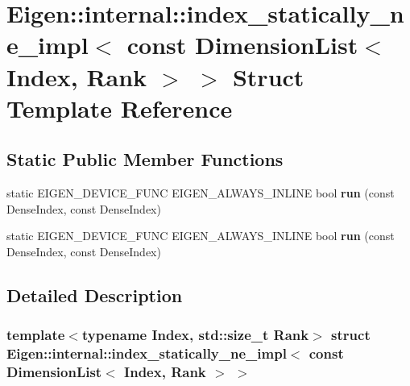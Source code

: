 \hypertarget{struct_eigen_1_1internal_1_1index__statically__ne__impl_3_01const_01_dimension_list_3_01_index_00_01_rank_01_4_01_4}{}\section{Eigen\+:\+:internal\+:\+:index\+\_\+statically\+\_\+ne\+\_\+impl$<$ const Dimension\+List$<$ Index, Rank $>$ $>$ Struct Template Reference}
\label{struct_eigen_1_1internal_1_1index__statically__ne__impl_3_01const_01_dimension_list_3_01_index_00_01_rank_01_4_01_4}
\subsection*{Static Public Member Functions}
\begin{DoxyCompactItemize}
\item 
\mbox{\label{struct_eigen_1_1internal_1_1index__statically__ne__impl_3_01const_01_dimension_list_3_01_index_00_01_rank_01_4_01_4_a2ba33884de59582908b842d65fdfe77e}} 
static E\+I\+G\+E\+N\+\_\+\+D\+E\+V\+I\+C\+E\+\_\+\+F\+U\+NC E\+I\+G\+E\+N\+\_\+\+A\+L\+W\+A\+Y\+S\+\_\+\+I\+N\+L\+I\+NE bool {\bfseries run} (const Dense\+Index, const Dense\+Index)
\item 
\mbox{\label{struct_eigen_1_1internal_1_1index__statically__ne__impl_3_01const_01_dimension_list_3_01_index_00_01_rank_01_4_01_4_a2ba33884de59582908b842d65fdfe77e}} 
static E\+I\+G\+E\+N\+\_\+\+D\+E\+V\+I\+C\+E\+\_\+\+F\+U\+NC E\+I\+G\+E\+N\+\_\+\+A\+L\+W\+A\+Y\+S\+\_\+\+I\+N\+L\+I\+NE bool {\bfseries run} (const Dense\+Index, const Dense\+Index)
\end{DoxyCompactItemize}


\subsection{Detailed Description}
\subsubsection*{template$<$typename Index, std\+::size\+\_\+t Rank$>$\newline
struct Eigen\+::internal\+::index\+\_\+statically\+\_\+ne\+\_\+impl$<$ const Dimension\+List$<$ Index, Rank $>$ $>$}




